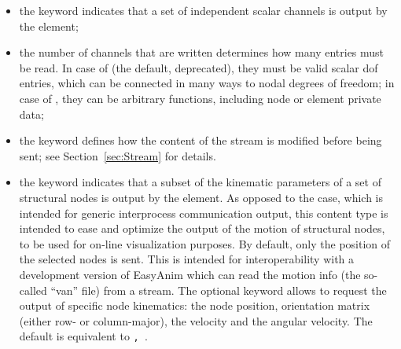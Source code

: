\begin{itemize}
\item the keyword  indicates that a set
of independent scalar channels is output by the element;

\item the number of channels  that are written
determines how many  entries must be read.
In case of  (the default, deprecated),
they must be valid scalar dof entries, which can be connected
in many ways to nodal degrees of freedom;
in case of , they can be arbitrary functions,
including node or element private data;

\item the keyword  defines how the content of the stream
is modified before being sent;
see Section~\ref{sec:Stream} for details.

\item the keyword  indicates that a subset of the kinematic
parameters of a set of structural nodes is output by the element.
As opposed to the  case, which is intended for generic
interprocess communication output, this content type is intended to ease
and optimize the output of the motion of structural nodes,
to be used for on-line visualization purposes.
By default, only the position of the selected nodes is sent.
This is intended for interoperability with a development version
of EasyAnim which can read the motion info (the so-called ``van'' file)
from a stream.
The optional keyword  allows to request the output
of specific node kinematics: the node position, orientation matrix
(either row- or column-major), the velocity and the angular velocity.
The default is equivalent to \texttt{, }.
\end{itemize}



